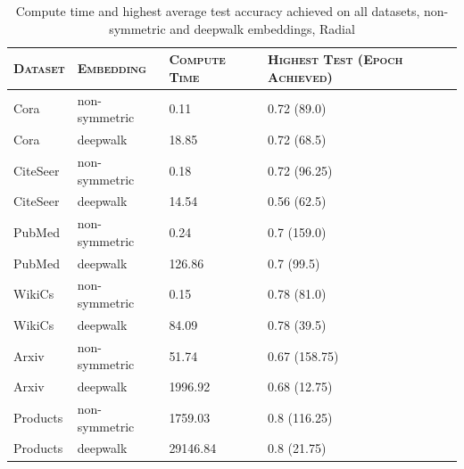 \begin{table}\caption{Compute time and highest average test accuracy achieved on all datasets, non-symmetric and deepwalk embeddings, Radial}\begin{center}\begin{tabular}{ | m{2cm} | m{2cm}| m{2cm} | m{2cm} }\hline\textsc{Dataset} & \textsc{Embedding} & \textsc{Compute Time} & \textsc{Highest Test (Epoch Achieved)}\\\hline Cora & non-symmetric & 0.11 & 0.72 (89.0)\\\hline Cora & deepwalk & 18.85 & 0.72 (68.5)\\\hline CiteSeer & non-symmetric & 0.18 & 0.72 (96.25)\\\hline CiteSeer & deepwalk & 14.54 & 0.56 (62.5)\\\hline PubMed & non-symmetric & 0.24 & 0.7 (159.0)\\\hline PubMed & deepwalk & 126.86 & 0.7 (99.5)\\\hline WikiCs & non-symmetric & 0.15 & 0.78 (81.0)\\\hline WikiCs & deepwalk & 84.09 & 0.78 (39.5)\\\hline Arxiv & non-symmetric & 51.74 & 0.67 (158.75)\\\hline Arxiv & deepwalk & 1996.92 & 0.68 (12.75)\\\hline Products & non-symmetric & 1759.03 & 0.8 (116.25)\\\hline Products & deepwalk & 29146.84 & 0.8 (21.75)\\\hline\end{tabular}\end{center}\end{table}